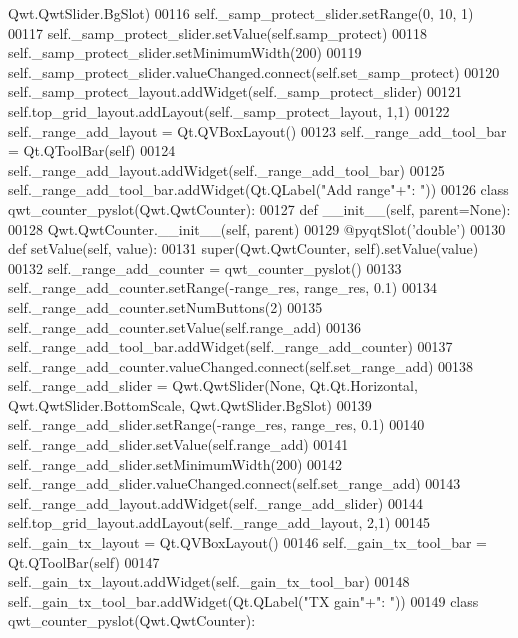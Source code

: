 \begin{DoxyCode}
      Qwt.QwtSlider.BgSlot)
00116         self.\_samp\_protect\_slider.setRange(0, 10, 1)
00117         self.\_samp\_protect\_slider.setValue(self.samp_protect)
00118         self.\_samp\_protect\_slider.setMinimumWidth(200)
00119         self.\_samp\_protect\_slider.valueChanged.connect(self.set_samp_protect)
00120         self.\_samp\_protect\_layout.addWidget(self._samp_protect_slider)
00121         self.top\_grid\_layout.addLayout(self._samp_protect_layout, 1,1)
00122         self._range_add_layout = Qt.QVBoxLayout()
00123         self._range_add_tool_bar = Qt.QToolBar(self)
00124         self.\_range\_add\_layout.addWidget(self._range_add_tool_bar)
00125         self.\_range\_add\_tool\_bar.addWidget(Qt.QLabel(\textcolor{stringliteral}{"Add range"}+\textcolor{stringliteral}{": "}))
00126         \textcolor{keyword}{class }qwt\_counter\_pyslot(Qwt.QwtCounter):
00127             \textcolor{keyword}{def }__init__(self, parent=None):
00128                 Qwt.QwtCounter.\_\_init\_\_(self, parent)
00129             @pyqtSlot(\textcolor{stringliteral}{'double'})
00130             \textcolor{keyword}{def }setValue(self, value):
00131                 super(Qwt.QwtCounter, self).setValue(value)
00132         self._range_add_counter = qwt\_counter\_pyslot()
00133         self.\_range\_add\_counter.setRange(-range\_res, range\_res, 0.1)
00134         self.\_range\_add\_counter.setNumButtons(2)
00135         self.\_range\_add\_counter.setValue(self.range_add)
00136         self.\_range\_add\_tool\_bar.addWidget(self._range_add_counter)
00137         self.\_range\_add\_counter.valueChanged.connect(self.set_range_add)
00138         self._range_add_slider = Qwt.QwtSlider(\textcolor{keywordtype}{None}, Qt.Qt.Horizontal, Qwt.QwtSlider.BottomScale, 
      Qwt.QwtSlider.BgSlot)
00139         self.\_range\_add\_slider.setRange(-range\_res, range\_res, 0.1)
00140         self.\_range\_add\_slider.setValue(self.range_add)
00141         self.\_range\_add\_slider.setMinimumWidth(200)
00142         self.\_range\_add\_slider.valueChanged.connect(self.set_range_add)
00143         self.\_range\_add\_layout.addWidget(self._range_add_slider)
00144         self.top\_grid\_layout.addLayout(self._range_add_layout, 2,1)
00145         self._gain_tx_layout = Qt.QVBoxLayout()
00146         self._gain_tx_tool_bar = Qt.QToolBar(self)
00147         self.\_gain\_tx\_layout.addWidget(self._gain_tx_tool_bar)
00148         self.\_gain\_tx\_tool\_bar.addWidget(Qt.QLabel(\textcolor{stringliteral}{"TX gain"}+\textcolor{stringliteral}{": "}))
00149         \textcolor{keyword}{class }qwt\_counter\_pyslot(Qwt.QwtCounter):

\end{DoxyCode}
